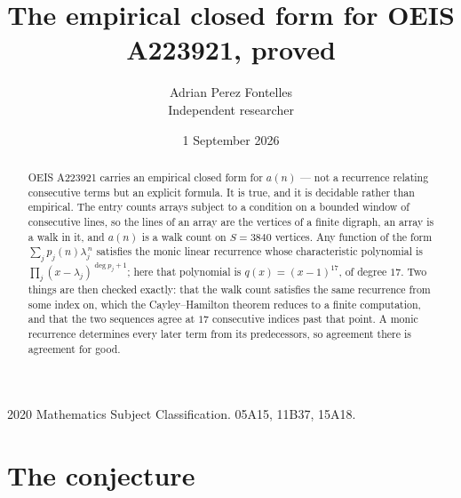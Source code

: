 \documentclass[11pt,a4paper]{article}
\title{The empirical closed form for OEIS A223921, proved}
\author{Adrian Perez Fontelles\\ \small Independent researcher}
\date{1 September 2026}
\theoremstyle{plain}
\theoremstyle{definition}
\begin{document}
\maketitle

\begin{abstract}
OEIS A223921 carries an empirical closed form for $a(n)$ --- not a recurrence relating
consecutive terms but an explicit formula. It is true, and it is decidable rather than
empirical. The entry counts arrays subject to a condition on a bounded window of consecutive lines, so the lines of an array are the
vertices of a finite digraph, an array is a walk in it, and $a(n)$ is a walk count on
$S=3840$ vertices. Any function of the form $\sum_j p_j(n)\lambda_j^{\,n}$ satisfies the
monic linear recurrence whose characteristic polynomial is
$\prod_j(x-\lambda_j)^{\deg p_j+1}$; here that polynomial is $q(x)=(x-1)^{17}$, of degree
$17$. Two things are then checked exactly: that the walk count satisfies the same
recurrence from some index on, which the Cayley--Hamilton theorem reduces to a finite
computation, and that the two sequences agree at $17$ consecutive indices past that
point. A monic recurrence determines every later term from its predecessors, so agreement
there is agreement for good.
\end{abstract}

\noindent\small 2020 Mathematics Subject Classification. 05A15, 11B37, 15A18.\normalsize

\section{The conjecture}
\end{document}
